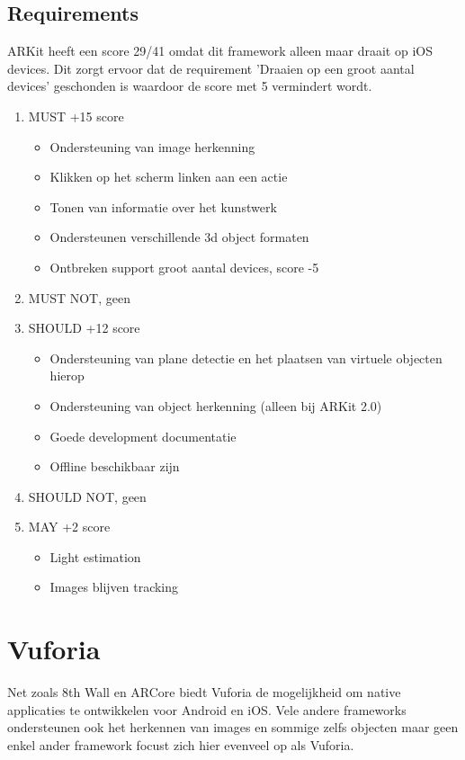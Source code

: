 \subsection{Requirements}
ARKit heeft een score 29/41 omdat dit framework alleen maar draait op iOS devices. Dit zorgt ervoor dat de requirement 'Draaien op een groot aantal devices' geschonden is waardoor de score met 5 vermindert wordt.
\begin{enumerate}
    \item MUST +15 score
    \begin{itemize}
        \item Ondersteuning van image herkenning
        \item Klikken op het scherm linken aan een actie 
        \item Tonen van informatie over het kunstwerk
        \item Ondersteunen verschillende 3d object formaten
        \item Ontbreken support groot aantal devices, score -5
    \end{itemize}
    \item MUST NOT, geen
    \item SHOULD +12 score
    \begin{itemize}
        \item Ondersteuning van plane detectie en het plaatsen van virtuele objecten hierop
        \item Ondersteuning van object herkenning (alleen bij ARKit 2.0)
        \item Goede development documentatie
        \item Offline beschikbaar zijn
    \end{itemize}
    \item SHOULD NOT, geen
    \item MAY +2 score
    \begin{itemize}
        \item Light estimation
        \item Images blijven tracking
    \end{itemize}
\end{enumerate}

\section{Vuforia}
Net zoals 8th Wall en ARCore biedt Vuforia de mogelijkheid om native applicaties te ontwikkelen voor Android en iOS. Vele andere frameworks ondersteunen ook het herkennen van images en sommige zelfs objecten maar geen enkel ander framework focust zich hier evenveel op als Vuforia.  

